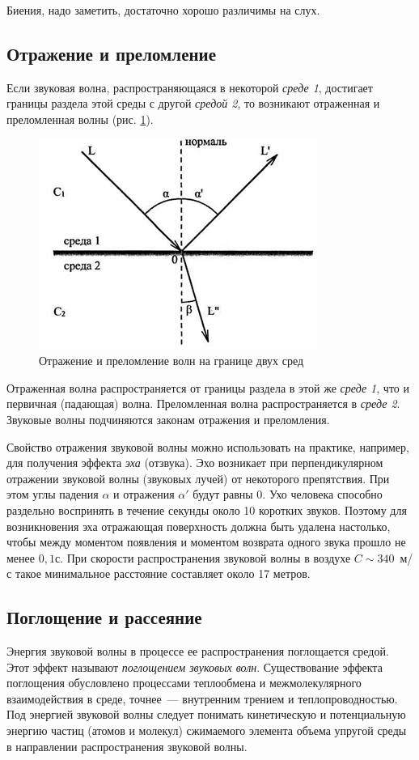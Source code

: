\documentclass[oneside, final, 14pt]{extreport}
\begin{document}
Биения, надо заметить, достаточно хорошо различимы на слух.

\subsection{Отражение и преломление}
Если звуковая волна, распространяющаяся в некоторой {\itshape среде 1}, достигает границы раздела этой среды с другой {\itshape средой 2}, то возникают отраженная и преломленная волны (рис. \ref{pic-reflection-01}).

\begin{figure}[h]
\centering
\includegraphics{pic-reflection-01}
\caption{Отражение и преломление волн на границе двух сред}
\label{pic-reflection-01}
\end{figure}

Отраженная волна распространяется от границы раздела в этой же {\itshape среде 1}, что и первичная (падающая) волна. Преломленная волна распространяется в {\itshape среде 2}. Звуковые волны подчиняются законам отражения и преломления.

Свойство отражения звуковой волны можно использовать на практике, например, для получения эффекта {\itshape эха} (отзвука). Эхо возникает при перпендикулярном отражении звуковой волны (звуковых лучей) от некоторого препятствия. При этом углы падения \(\alpha\) и отражения \(\alpha'\) будут равны \(0\). Ухо человека способно раздельно воспринять в течение секунды около 10 коротких звуков. Поэтому для возникновения эха отражающая поверхность должна быть удалена настолько, чтобы между моментом появления и моментом возврата одного звука прошло не менее \(0,1 с\). При скорости распространения звуковой волны в воздухе \(C \sim 340\)~м/с такое минимальное расстояние составляет около 17 метров.

\subsection{Поглощение и рассеяние}
Энергия звуковой волны в процессе ее распространения поглощается средой. Этот эффект называют {\itshape поглощением звуковых волн}. Существование эффекта поглощения обусловлено процессами теплообмена и межмолекулярного взаимодействия в среде, точнее~--- внутренним трением и теплопроводностью. Под энергией звуковой волны следует понимать кинетическую и потенциальную энергию частиц (атомов и молекул) сжимаемого элемента объема упругой среды в направлении распространения звуковой волны.
\end{document}

